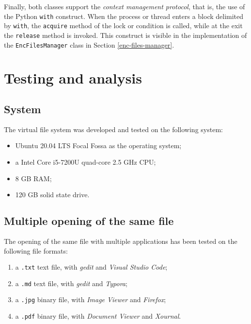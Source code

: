 \documentclass[a4paper,12pt,twoside,openright]{report}
\begin{document}
  Finally, both classes support the \textit{context management protocol}, that is,
  the use of the Python \texttt{with} construct. When the process or thread enters a block delimited
  by \texttt{with}, the \texttt{acquire} method of the lock or condition is called, while at the exit the \texttt{release} method is invoked.
  This construct is visible in the implementation of the \texttt{EncFilesManager} class in Section \ref{enc-files-manager}.


  \chapter{Testing and analysis}
  \thispagestyle{fancy}

  \section{System}

  The virtual file system was developed and tested on the following system:

  \begin{itemize}
    \item Ubuntu 20.04 LTS Focal Fossa as the operating system;
    \item a Intel Core i5-7200U quad-core 2.5 GHz CPU;
    \item 8 GB RAM;
    \item 120 GB solid state drive.
  \end{itemize}

  \section{Multiple opening of the same file}

  The opening of the same file with multiple applications has been tested on the following file formats:
  \begin{enumerate}
    \item a \texttt{.txt} text file, with \textit{gedit} and \textit{Visual Studio Code};
    \item a \texttt{.md} text file, with \textit{gedit} and \textit{Typora};
    \item a \texttt{.jpg} binary file, with \textit{Image Viewer} and \textit{Firefox};
    \item a \texttt{.pdf} binary file, with \textit{Document Viewer} and \textit{Xournal}.
  \end{enumerate}
\end{document}
